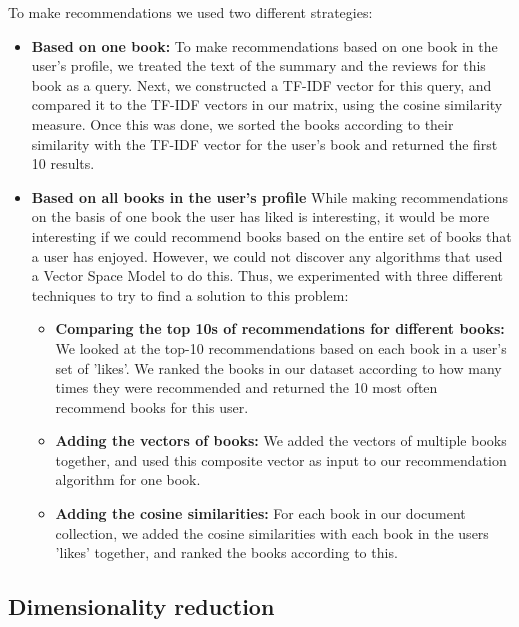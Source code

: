 \documentclass[10pt,a4paper]{paper}
\begin{document}
To make recommendations we used two different strategies:
\begin{itemize}
\item \textbf{Based on one book:} To make recommendations based on one book in the user's profile, we treated the text of the summary and the reviews for this book as a query. Next, we constructed a TF-IDF vector for this query, and compared it to the TF-IDF vectors in our matrix, using the cosine similarity measure. Once this was done, we sorted the books according to their similarity with the TF-IDF vector for the user's book and returned the first 10 results.
\item \textbf{Based on all books in the user's profile} While making recommendations on the basis of one book the user has liked is interesting, it would be more interesting if we could recommend books based on the entire set of books that a user has enjoyed. However, we could not discover any algorithms that used a Vector Space Model to do this. Thus, we experimented with three different techniques to try to find a solution to this problem:
\begin{itemize}
\item \textbf{Comparing the top 10s of recommendations for different books: } We looked at the top-10 recommendations based on each book in a user's set of 'likes'. We ranked the books in our dataset according to how many times they were recommended and returned the 10 most often recommend books for this user. 
\item \textbf{Adding the vectors of books:} We added the vectors of multiple books together, and used this composite vector as input to our recommendation algorithm for one book.
\item \textbf{Adding the cosine similarities:} For each book in our document collection, we added the cosine similarities with each book in the users 'likes' together, and ranked the books according to this.
\end{itemize}
\end{itemize}

\subsection{Dimensionality reduction}
\end{document}

